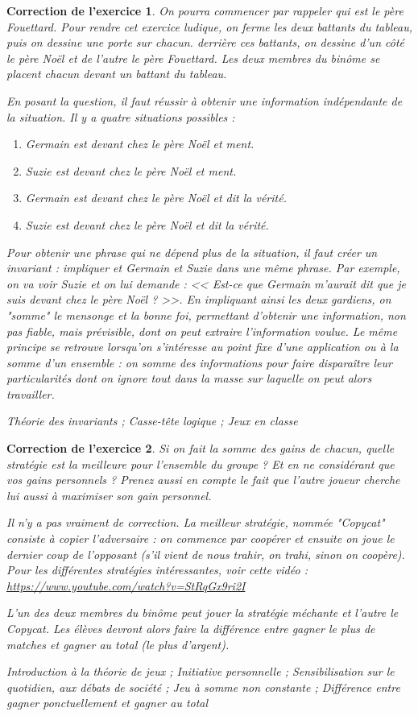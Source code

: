 \documentclass[12pt]{article}
\theoremstyle{break}
\newtheorem{cor}{Correction de l'exercice}
\begin{document}
\begin{cor}
On pourra commencer par rappeler qui est le père Fouettard. Pour rendre cet exercice ludique, on ferme les deux battants du tableau, puis on dessine une porte sur chacun. derrière ces battants, on dessine d'un côté le père Noël et de l'autre le père Fouettard. Les deux membres du binôme se placent chacun devant un battant du tableau.

En posant la question, il faut réussir à obtenir une information indépendante de la situation. Il y a quatre situations possibles :\begin{enumerate}
\item Germain est devant chez le père Noël et ment.
\item Suzie est devant chez le père Noël et ment.
\item Germain est devant chez le père Noël et dit la vérité.
\item Suzie est devant chez le père Noël et dit la vérité.
\end{enumerate}

Pour obtenir une phrase qui ne dépend plus de la situation, il faut créer un invariant : impliquer et Germain et Suzie dans une même phrase. Par exemple, on va voir Suzie et on lui demande : << Est-ce que Germain m'aurait dit que je suis devant chez le père Noël ? >>. En impliquant ainsi les deux gardiens, on "somme" le mensonge et la bonne foi, permettant d'obtenir une information, non pas fiable, mais prévisible, dont on peut extraire l'information voulue. Le même principe se retrouve lorsqu'on s'intéresse au point fixe d'une application ou à la somme d'un ensemble : on somme des informations pour faire disparaître leur particularités dont on ignore tout dans la masse sur laquelle on peut alors travailler.

\textit{Théorie des invariants ; Casse-tête logique ; Jeux en classe}
\end{cor}


\begin{cor}
\textit{Si on fait la somme des gains de chacun, quelle stratégie est la meilleure pour l'ensemble du groupe ? Et en ne considérant que vos gains personnels ? Prenez aussi en compte le fait que l'autre joueur cherche lui aussi à maximiser son gain personnel.}

Il n'y a pas vraiment de correction. La meilleur stratégie, nommée "Copycat" consiste à copier l'adversaire : on commence par coopérer et ensuite on joue le dernier coup de l'opposant (s'il vient de nous trahir, on trahi, sinon on coopère). Pour les différentes stratégies intéressantes, voir cette vidéo : \url{https://www.youtube.com/watch?v=StRqGx9ri2I}

L'un des deux membres du binôme peut jouer la stratégie méchante et l'autre le Copycat. Les élèves devront alors faire la différence entre gagner le plus de matches et gagner au total (le plus d'argent). \newline

\textit{Introduction à la théorie de jeux ; Initiative personnelle ; Sensibilisation sur le quotidien, aux débats de société ; Jeu à somme non constante ; Différence entre gagner ponctuellement et gagner au total}
\end{cor}
\end{document}
